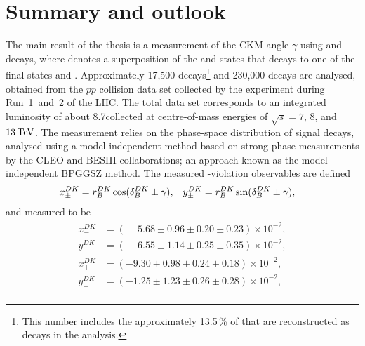 

\chapter{Summary and outlook}
\label{ch:6-conclusion}

The main result of the thesis is a measurement of the CKM angle $\gamma$ using \BtoDK and \BtoDpi decays, where \D denotes a superposition of the \Dz and \Dzb states that decays to one of the final states \Kspipi and \KsKK. Approximately 17,500 \BtoDK decays\footnote{This number includes the approximately 13.5\,\% of \BtoDK that are reconstructed as \BtoDpi decays in the analysis.} and 230,000 \BtoDpi decays are analysed, obtained from the $pp$ collision data set collected by the \lhcb experiment during Run~1~and~2 of the LHC. The total data set corresponds to an integrated luminosity of about 8.7\invfb collected at centre-of-mass energies of $\sqrt s =7$, $8$, and $13\text{\,Te\kern -0.1em V}$. The measurement relies on the phase-space distribution of signal decays, analysed using a model-independent method based on strong-phase measurements by the CLEO and BESIII collaborations; an approach known as the model-independent BPGGSZ method. The measured \CP-violation observables are defined
\begin{align}
    x_\pm^{{D}{K}} &= r_B^{DK} \cos (\delta_B^{DK} \pm \gamma), & y_\pm^{{D}{K}} &= r_B^{DK} \sin (\delta_B^{DK} \pm \gamma),
\end{align}
and measured to be
\begin{align}
\begin{split}
    x_-^{DK} & = (\phantom{-}5.68 \pm 0.96 \pm  0.20\pm 0.23) \times 10^{-2}, \\
    y_-^{DK} & = (\phantom{-}6.55 \pm 1.14 \pm  0.25\pm 0.35) \times 10^{-2}, \\
    x_+^{DK} & = (         - 9.30 \pm 0.98 \pm  0.24\pm 0.18) \times 10^{-2}, \\
    y_+^{DK} & = (         - 1.25 \pm 1.23 \pm  0.26\pm 0.28) \times 10^{-2},
\end{split}
\end{align}
